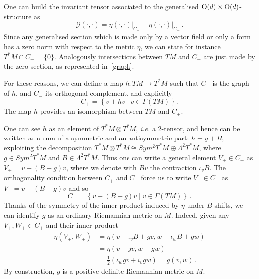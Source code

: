 \documentclass[debug]{phd}
\begin{document}
						One can build the invariant tensor associated to the generalised $\mathrm{O}(d) \times \mathrm{O}(d)$-structure as
								\begin{equation}\label{Gmetr}
									\mathcal{G}(\cdot,\cdot) = \eta(\cdot,\cdot) \big|_{C_{+}} - \eta(\cdot,\cdot)\big|_{C_{-}} \, .
								\end{equation}
						Since any generalised section which is made only by a vector field or only a form has a zero norm with respect to the metric $\eta$, we can state for instance $T^*M \cap C_{\pm} = \{0\}$. 
						Analogously intersections between $TM$ and $C_{\pm}$ are just made by the zero section, as represented in~\cref{graph}.
						
						For these reasons, we can define a map $h : TM \longrightarrow T^*M$ such that $C_{+}$ is the graph of $h$, and $C_{-}$ its orthogonal complement, and explicitly
								\begin{equation}\label{cplus}
									C_{+} = \left\{v+ hv \mid v \in \Gamma\left(TM\right)\right\}.
								\end{equation}
						The map $h$ provides an isomorphism between $TM$ and $C_{+}$.
						
						One can see $h$ as an element of $T^*M \otimes T^*M$, \emph{i.e.} a $2$-tensor, and hence can be written as a sum of a symmetric and an antisymmetric part: $h=g+B$, exploiting the decomposition $T^*M \otimes T^*M \cong Sym^2 T^*M \oplus \Lambda^2 T^*M$, where $g \in Sym^2 T^*M$ and $B \in \Lambda^2 T^*M$. 
						Thus one can write a general element $V_{+} \in C_{+}$ as $V_{+} = v + \left(B + g \right)v$, where we denote with $Bv$ the contraction $\iota_v B$. 
						The orthogonality condition between $C_{+}$ and $C_{-}$ force us to write $V_{-} \in C_{-}$ as $V_{-} = v + \left(B - g \right)v$ and so
								\begin{equation}\label{cminus}
									C_{-} = \left\{v+ \left(B-g\right)v \mid v \in \Gamma\left(TM\right)\right\} \, .
								\end{equation}
						Thanks of the symmetry of the inner product induced by $\eta$ under $B$ shifts, we can identify $g$ as an ordinary Riemannian metric on $M$.
						Indeed, given any $V_{+}, W_{+} \in C_{+}$ and their inner product
								\begin{equation*}
									\begin{split}
										\eta \left( V_{+}, W_{+} \right) 	& = \eta( v + \iota_v B + g v , w + \iota_w B + g w ) \\
 																& = \eta( v + gv , w + gw ) \\
 																& = \frac{1}{2} \left( \iota_w g v + i_v g w \right) = g\left(v,w\right)\, .
									\end{split}
								\end{equation*}
						By construction, $g$ is a positive definite Riemannian metric on $M$.
						
\end{document}
